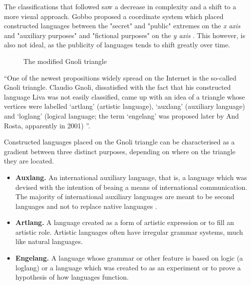 \documentclass[14pt, a4paper]{extreport}
\begin{document}
The classifications that followed saw a decrease in complexity and a shift to a more visual approach. Gobbo proposed a coordinate system which placed constructed languages between the "secret" and "public" extremes on the \textit{x axis} and "auxiliary purposes" and "fictional purposes" on the \textit{y axis} \parencite{gobbo}. This however, is also not ideal, as the publicity of languages tends to shift greatly over time.

\begin{figure}[ht]%
  \bigskip
  \centering
  \caption{The modified Gnoli triangle}
\end{figure}%

``One of the newest propositions widely spread on the Internet is the so-called Gnoli triangle. Claudio Gnoli, dissatisfied with the fact that his constructed language Liva was not easily classified, came up with an idea of a triangle whose vertices were labelled ‘artlang’ (artistic language), ‘auxlang’ (auxiliary language) and ‘loglang’ (logical language; the term ‘engelang’ was proposed later by And Rosta, apparently in 2001) \parencite[97]{stria}''.

Constructed languages placed on the Gnoli triangle can be characterised as a gradient between three distinct purposes, depending on where on the triangle they are located.

\begin{itemize}
  \item \textbf{Auxlang.} An international auxiliary language, that is, a language which was devised with the intention of beaing a means of international communication. The majority of international auxiliary languages are meant to be second languages and not to replace native languages \parencite{reed}.
  \item \textbf{Artlang.} A language created as a form of artistic expression or to fill an artistic role. Artistic languages often have irregular grammar systems, much like natural languages.
  \item \textbf{Engelang.} A language whose grammar or other feature is based on logic (a loglang) or a language which was created to as an experiment or to prove a hypothesis of how languages function.
\end{itemize}
\end{document}
